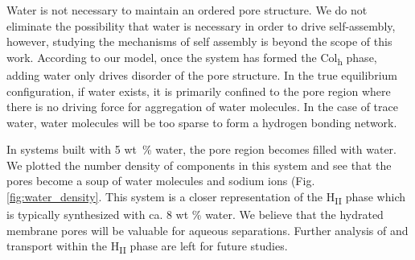 \documentclass{article}
\begin{document}
  Water is not necessary to maintain an ordered pore structure. We do not
  eliminate the possibility that water is necessary in order to drive
  self-assembly, however, studying the mechanisms of self assembly is beyond the
  scope of this work. According to our model, once the system has formed the
  Col\textsubscript{h} phase, adding water only drives disorder of the pore
  structure. In the true equilibrium configuration, if water exists, it is
  primarily confined to the pore region where there is no driving force for
  aggregation of water molecules. In the case of trace water, water molecules
  will be too sparse to form a hydrogen bonding network.

  In systems built with 5 wt~\% water, the pore region becomes filled with
  water. We plotted the number density of components in this system and see that
  the pores become a soup of water molecules and sodium ions (Fig.
  \ref{fig:water_density}. This system is a closer representation of the
  H\textsubscript{II} phase which is typically synthesized with ca. 8 wt \%
  water. We believe that the hydrated membrane pores will be valuable for aqueous
  separations. Further analysis of and transport within the H\textsubscript{II}
  phase are left for future studies.
\end{document}
